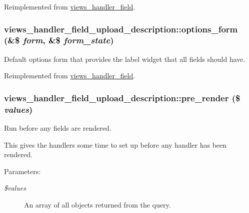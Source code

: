 Reimplemented from \hyperlink{classviews__handler__field_64c69a8a3697603f8283405071c25b76}{views\_\-handler\_\-field}.\hypertarget{classviews__handler__field__upload__description_714cc6455e6fa7c9426dcf08dee9f89e}{
\subsubsection[{options\_\-form}]{\setlength{\rightskip}{0pt plus 5cm}views\_\-handler\_\-field\_\-upload\_\-description::options\_\-form (\&\$ {\em form}, \/  \&\$ {\em form\_\-state})}}
\label{classviews__handler__field__upload__description_714cc6455e6fa7c9426dcf08dee9f89e}


Default options form that provides the label widget that all fields should have. 

Reimplemented from \hyperlink{classviews__handler__field_0435d161922b7b4b84f02a2e79bb947a}{views\_\-handler\_\-field}.\hypertarget{classviews__handler__field__upload__description_0890ab0770ad73dc186283a2222d473c}{
\subsubsection[{pre\_\-render}]{\setlength{\rightskip}{0pt plus 5cm}views\_\-handler\_\-field\_\-upload\_\-description::pre\_\-render (\$ {\em values})}}
\label{classviews__handler__field__upload__description_0890ab0770ad73dc186283a2222d473c}


Run before any fields are rendered.

This gives the handlers some time to set up before any handler has been rendered.

\begin{Desc}
\item[Parameters:]
\begin{description}
\item[{\em \$values}]An array of all objects returned from the query. \end{description}
\end{Desc}


